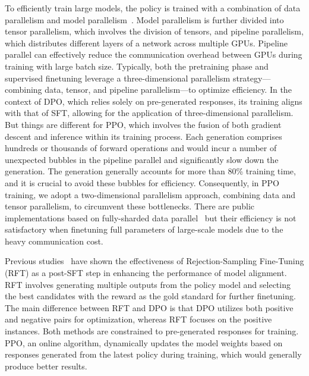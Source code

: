 To efficiently train large models, the policy is trained with a combination of data parallelism and model parallelism~\cite{rasley2020deepspeed,narayanan2021efficient}. Model parallelism is further divided into tensor parallelism, which involves the division of tensors, and pipeline parallelism, which distributes different layers of a network across multiple GPUs.
Pipeline parallel can effectively reduce the communication overhead between GPUs during training with large batch size.
Typically, both the pretraining phase and supervised finetuning leverage a three-dimensional parallelism strategy—combining data, tensor, and pipeline parallelism—to optimize efficiency.
In the context of DPO, which relies solely on pre-generated responses, its training aligns with that of SFT, allowing for the application of three-dimensional parallelism.
But things are different for PPO, which involves the fusion of both gradient descent and inference within its training process.
Each generation comprises hundreds or thousands of forward operations and would incur a number of unexpected bubbles in the pipeline parallel and significantly slow down the generation. 
The generation generally accounts for more than 80\% training time, and it is crucial to avoid these bubbles for efficiency.
Consequently, in PPO training, we adopt a two-dimensional parallelism approach, combining data and tensor parallelism, to circumvent these bottlenecks.
There are public implementations based on fully-sharded data parallel~\cite{yao2023deepspeed, havrilla-etal-2023-trlx} but their efficiency is not satisfactory when finetuning full parameters of large-scale models due to the heavy communication cost. 

Previous studies~\cite{touvron2023llama} have shown the effectiveness of Rejection-Sampling Fine-Tuning (RFT) as a post-SFT step in enhancing the performance of model alignment. RFT involves generating multiple outputs from the policy model and selecting the best candidates with the reward as the gold standard for further finetuning. The main difference between RFT and DPO is that DPO utilizes both positive and negative pairs for optimization, whereas RFT focuses on the positive instances. Both methods are constrained to pre-generated responses for training. PPO, an online algorithm, dynamically updates the model weights based on responses generated from the latest policy during training, which would generally produce better results.

